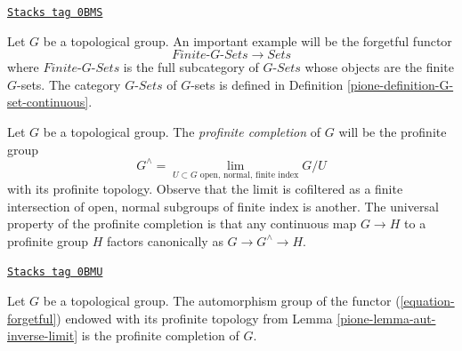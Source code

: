 \begin{example}
\label{pione-example-galois-category-G-sets}
\href{https://stacks.math.columbia.edu/tag/0BMS}{\texttt{Stacks tag 0BMS}}

Let $G$ be a topological group. An important example will be the
forgetful functor
\begin{equation}
\label{equation-forgetful}
\textit{Finite-}G\textit{-Sets} \longrightarrow \textit{Sets}
\end{equation}
where $\textit{Finite-}G\textit{-Sets}$ is the full subcategory of
$G\textit{-Sets}$ whose objects are the finite $G$-sets.
The category $G\textit{-Sets}$ of $G$-sets is defined in
Definition \ref{pione-definition-G-set-continuous}.
\end{example}

Let $G$ be a topological group. The {\it profinite completion} of $G$
will be the profinite group
$$
G^\wedge =
\lim_{U \subset G\text{ open, normal, finite index}} G/U
$$
with its profinite topology. Observe that the limit is cofiltered
as a finite intersection of open, normal subgroups of finite index
is another. The universal property of the profinite completion is
that any continuous map $G \to H$ to a profinite group $H$ factors
canonically as $G \to G^\wedge \to H$.

\begin{lemma}
\label{pione-lemma-single-out-profinite}
\href{https://stacks.math.columbia.edu/tag/0BMU}{\texttt{Stacks tag 0BMU}}

Let $G$ be a topological group. The automorphism group of the functor
(\ref{equation-forgetful}) endowed with its profinite topology from
Lemma \ref{pione-lemma-aut-inverse-limit} is the profinite completion of $G$.
\end{lemma}

